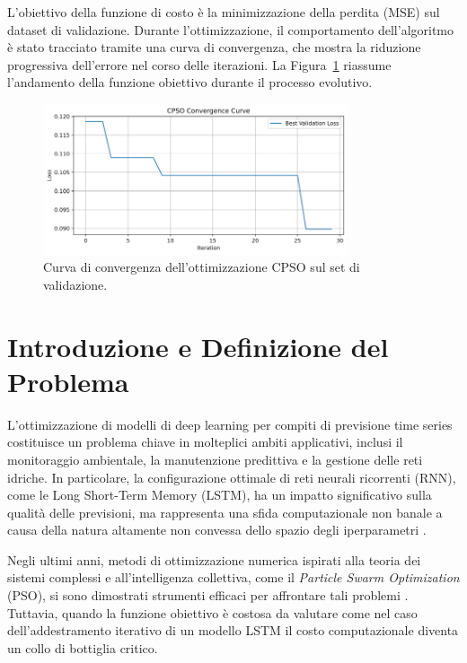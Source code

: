\documentclass{article}
\begin{document}
L’obiettivo della funzione di costo è la minimizzazione della perdita (MSE) sul dataset di validazione. Durante l’ottimizzazione, il comportamento dell’algoritmo è stato tracciato tramite una curva di convergenza, che mostra la riduzione progressiva dell’errore nel corso delle iterazioni. La Figura~\ref{fig:cpso} riassume l’andamento della funzione obiettivo durante il processo evolutivo.

\begin{figure}[H]
    \centering
    \includegraphics[width=0.8\textwidth]{img/CPSO Convergence Curve.png}
    \caption{Curva di convergenza dell’ottimizzazione CPSO sul set di validazione.}
    \label{fig:cpso}
\end{figure}


\section{Introduzione e Definizione del Problema}

L'ottimizzazione di modelli di deep learning per compiti di previsione time series costituisce un problema chiave in molteplici ambiti applicativi, inclusi il monitoraggio ambientale, la manutenzione predittiva e la gestione delle reti idriche. In particolare, la configurazione ottimale di reti neurali ricorrenti (RNN), come le Long Short-Term Memory (LSTM), ha un impatto significativo sulla qualità delle previsioni, ma rappresenta una sfida computazionale non banale a causa della natura altamente non convessa dello spazio degli iperparametri \cite{bergstra2012random}.

Negli ultimi anni, metodi di ottimizzazione numerica ispirati alla teoria dei sistemi complessi e all'intelligenza collettiva, come il \textit{Particle Swarm Optimization} (PSO), si sono dimostrati strumenti efficaci per affrontare tali problemi \cite{kennedy1995particle, eberhart2001pso}. Tuttavia, quando la funzione obiettivo è costosa da valutare come nel caso dell'addestramento iterativo di un modello LSTM il costo computazionale diventa un collo di bottiglia critico.
\end{document}
